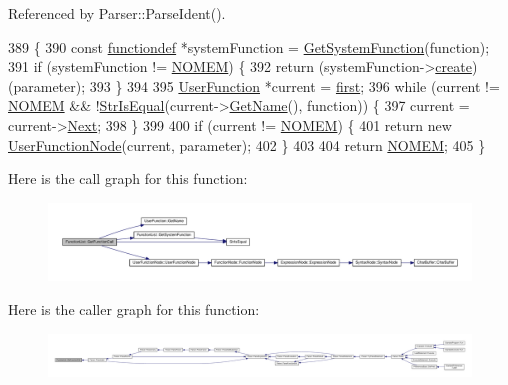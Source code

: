 Referenced by Parser\+::\+Parse\+Ident().


\begin{DoxyCode}
389 \{
390     \textcolor{keyword}{const} \hyperlink{structfunctiondef}{functiondef} *systemFunction = \hyperlink{classFunctionList_aabcebb1bdf56aee163f96483dcdc603c}{GetSystemFunction}(\textcolor{keyword}{function});
391     \textcolor{keywordflow}{if} (systemFunction != \hyperlink{platform_8h_a46ff2bfbf0d44b8466a2251d5bd5e6f8}{NOMEM}) \{
392         \textcolor{keywordflow}{return} (systemFunction->\hyperlink{structfunctiondef_a323f2d4c5ae5923f8f76c76b3c77b42e}{create})(parameter);
393     \}
394 
395     \hyperlink{classUserFunction}{UserFunction} *current = \hyperlink{classFunctionList_a4a0534f4240022c58c3e06234e7f9f99}{first};
396     \textcolor{keywordflow}{while} (current != \hyperlink{platform_8h_a46ff2bfbf0d44b8466a2251d5bd5e6f8}{NOMEM} && !\hyperlink{clib_8h_a2a1f39d11cbbaac992d42e67557dac4b}{StrIsEqual}(current->\hyperlink{classUserFunction_a59c59ebf5b45c5bb4aaa200a1218549d}{GetName}(), \textcolor{keyword}{function})) \{
397         current = current->\hyperlink{classUserFunction_a5463f575d2ed50c0dbe069ec2841a5c9}{Next};
398     \}
399 
400     \textcolor{keywordflow}{if} (current != \hyperlink{platform_8h_a46ff2bfbf0d44b8466a2251d5bd5e6f8}{NOMEM}) \{
401         \textcolor{keywordflow}{return} \textcolor{keyword}{new} \hyperlink{classUserFunctionNode}{UserFunctionNode}(current, parameter);
402     \}
403 
404     \textcolor{keywordflow}{return} \hyperlink{platform_8h_a46ff2bfbf0d44b8466a2251d5bd5e6f8}{NOMEM};
405 \}
\end{DoxyCode}


Here is the call graph for this function\+:\nopagebreak
\begin{figure}[H]
\begin{center}
\leavevmode
\includegraphics[width=350pt]{classFunctionList_ae8dc9d2913429faefdfed463ae3272c1_cgraph}
\end{center}
\end{figure}




Here is the caller graph for this function\+:\nopagebreak
\begin{figure}[H]
\begin{center}
\leavevmode
\includegraphics[width=350pt]{classFunctionList_ae8dc9d2913429faefdfed463ae3272c1_icgraph}
\end{center}
\end{figure}


